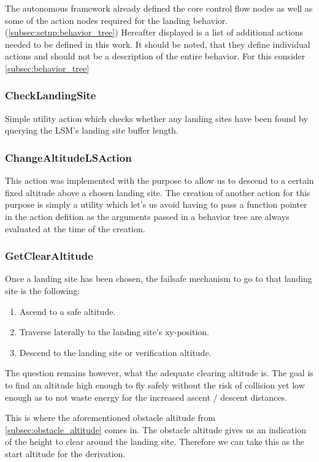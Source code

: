 The autonomous framework already defined the core control flow nodes as well as some of the action nodes required for the landing behavior. (\ref{subsec:setup:behavior_tree}) Hereafter displayed is a list of additional actions needed to be defined in this work. It should be noted, that they define individual actions and should not be a description of the entire behavior. For this consider \cref{subsec:behavior_tree}

\subsubsection{CheckLandingSite}

Simple utility action which checks whether any landing sites have been found by querying the LSM's landing site buffer length.

\subsubsection{ChangeAltitudeLSAction}

This action was implemented with the purpose to allow us to descend to a certain fixed altitude above a chosen landing site. The creation of another action for this purpose is simply a utility which let's us avoid having to pass a function pointer in the action defition as the arguments passed in a behavior tree are always evaluated at the time of the creation.


\subsubsection{GetClearAltitude}
Once a landing site has been chosen, the failsafe mechanism to go to that landing site is the following:

\begin{enumerate}
    \item Ascend to a safe altitude.
    \item Traverse laterally to the landing site's xy-position.
    \item Descend to the landing site or verification altitude.
\end{enumerate}

The question remains however, what the adequate clearing altitude is. The goal is to find an altitude high enough to fly safely without the risk of collision yet low enough as to not waste energy for the increased ascent / descent distances.

This is where the aforementioned obstacle altitude from \cref{subsec:obstacle_altitude} comes in. The obstacle altitude gives us an indication of the height to clear around the landing site. Therefore we can take this as the start altitude for the derivation.

